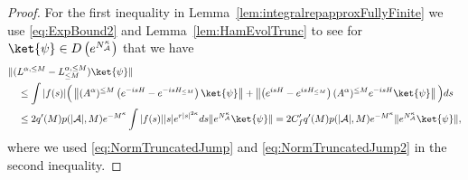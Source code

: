 \documentclass[11pt]{amsart}
\newcommand{\nn}{\nonumber}
\newcommand{\1}{\mathbbm{1}}
\newcommand{\NA}{N_{\mathcal{A}}}
\newcommand{\cA}{\mathcal{A}}
\newcommand{\Ntot}{N_{\operatorname{tot}}}
\newcommand{\bin}[1]{}
\theoremstyle{plain}
\theoremstyle{definition}
\theoremstyle{remark}
\numberwithin{equation}{section}
\begin{document}
\begin{proof}


For the first inequality in Lemma~\ref{lem:integralrepapproxFullyFinite} we use \eqref{eq:ExpBound2} and Lemma~\ref{lem:HamEvolTrunc} to see for $\ket{\psi}\in D\left(e^{\NA^{\kappa}}\right)$ that we have
\begin{align}
\label{eq:NLLeqFullyFinite}
\nn&\|(L^{\alpha,\le M}-L^{\alpha,\le M}_{\le M})\ket{\psi}\|
\\&\quad\le \int |f(s)|\Big(\left\|(A^{\alpha})^{\le M}\left(e^{-isH} -e^{-isH_{\le M}}\right)\ket{\psi}\right\|\nn+ \left\|\left(e^{isH} -e^{isH_{\le M}}\right)(A^{\alpha})^{\le M} e^{-isH}\ket{\psi}\right\|\Big)ds
\\&\quad\le 2q'(M)p(|\cA|,M)e^{-M^{\kappa}}
\int|f(s)| |s|e^{r|s|^{2\kappa}}ds\|e^{\NA^{\kappa}}\ket{\psi}\| = 2C'_fq'(M)p(|\cA|,M)e^{-M^{\kappa}}
\|e^{\NA^{\kappa}}\ket{\psi}\|,
\end{align}
where we used \eqref{eq:NormTruncatedJump} and \eqref{eq:NormTruncatedJump2} in the second inequality.



\bin{First, we use the estimates derived in Lemma \ref{lem.displaceblocks} to see for  $\ket{\psi}\in D(\Ntot+I)$, denoting $N_i:=a_i^\dagger a_i$, 
\begin{align*}
\|(\Ntot+I)\ket{\psi}\|^2&=\bra{\psi}\left(\sum_{j=1}^m N_j+I\right)^2\ket{\psi}\\
&\le m\sum_{j\in[m]}\bra{\psi}(N_j+I)^2\ket{\psi}\\
&=m\sum_{j\in[m]}\|(N_j+I)\ket{\psi}\|^2.
\end{align*}
Applying this bound to $\ket{\psi}=(a_i-(a^D_\alpha)_i)\ket{\varphi}$, we get
\begin{align*}
&\|(\Ntot+I)(a_i-(a^D_\alpha)_i)\ket{\varphi}\|^2\\
&\quad \le m\,\sum_{j\ne i}4|\alpha|^2\|(N_j+I)(N_i+I)\ket{\varphi}\|^2\\
&\quad + 25m |\alpha|^2\|(N_i+I)^2\ket{\varphi}\|^2\\
&\quad \le 25m^2|\alpha|^2\sum_{j\in[m]}\,\|(N_j+I)^2\ket{\varphi}\|^2\\
&\quad \le 25m^3|\alpha|^2\|(\Ntot+I)^2\ket{\varphi}\|^2.
\end{align*}



Thus, we have derived that
\begin{align}
\|(\Ntot\!+\!1)(L_{i}\!-\!L_{\alpha,i})\!\ket{\varphi}\!\|\!\le\! 5C_{2,f}m^{\frac{3}{2}}|\alpha|\|(\Ntot+I)^2\!\ket{\varphi}\!\|.
\end{align}}


\end{proof}
\end{document}
